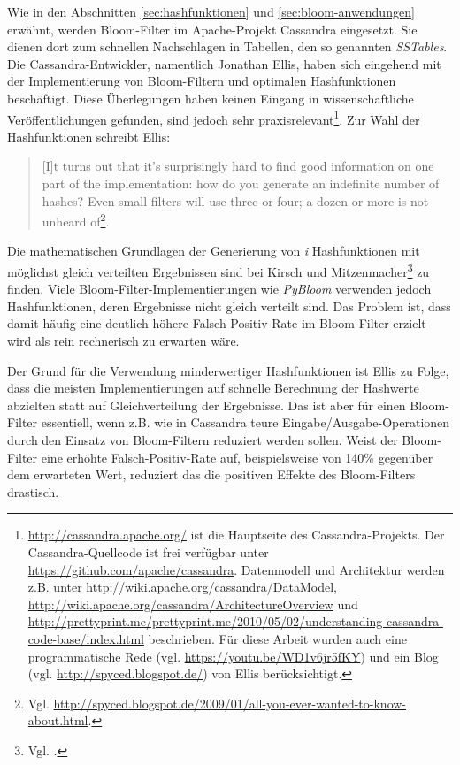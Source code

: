 Wie in den Abschnitten \ref{sec:hashfunktionen} und \ref{sec:bloom-anwendungen} erwähnt, werden Bloom-Filter im Apache-Projekt Cassandra eingesetzt. Sie dienen dort zum schnellen Nachschlagen in Tabellen, den so genannten \textit{SSTables}. Die Cassandra-Entwickler, namentlich Jonathan Ellis, haben sich eingehend mit der Implementierung von Bloom-Filtern und optimalen Hashfunktionen beschäftigt. Diese Überlegungen haben keinen Eingang in wissenschaftliche Veröffentlichungen gefunden, sind jedoch sehr praxisrelevant\footnote{\url{http://cassandra.apache.org/} ist die Hauptseite des Cassandra-Projekts. Der Cassandra-Quellcode ist frei verfügbar unter \url{https://github.com/apache/cassandra}. Datenmodell und Architektur werden z.B. unter \url{http://wiki.apache.org/cassandra/DataModel}, \url{http://wiki.apache.org/cassandra/ArchitectureOverview} und \url{http://prettyprint.me/prettyprint.me/2010/05/02/understanding-cassandra-code-base/index.html} beschrieben. Für diese Arbeit wurden auch eine programmatische Rede (vgl. \url{https://youtu.be/WD1v6jr5fKY}) und ein Blog (vgl. \url{http://spyced.blogspot.de/}) von Ellis berücksichtigt.}. Zur Wahl der Hashfunktionen schreibt Ellis: 
\newpage
\begin{quote}
[I]t turns out that it's surprisingly hard to find good information on one part of the implementation: how do you generate an indefinite number of hashes? Even small filters will use three or four; a dozen or more is not unheard of\footnote{Vgl. \url{http://spyced.blogspot.de/2009/01/all-you-ever-wanted-to-know-about.html}.}. 
\end{quote}
Die mathematischen Grundlagen der Generierung von \textit{i} Hashfunktionen mit möglichst gleich verteilten Ergebnissen sind bei Kirsch und Mitzenmacher\footnote{Vgl. \cite{Kirsch2006}.} zu finden. Viele Bloom-Filter-Implementierungen wie \textit{PyBloom} verwenden jedoch Hashfunktionen, deren Ergebnisse nicht gleich verteilt sind. Das Problem ist, dass damit häufig eine deutlich höhere Falsch-Positiv-Rate im Bloom-Filter erzielt wird als rein rechnerisch zu erwarten wäre. 

Der Grund für die Verwendung minderwertiger Hashfunktionen ist Ellis zu Folge, dass die meisten Implementierungen auf schnelle Berechnung der Hashwerte abzielten statt auf Gleichverteilung der Ergebnisse. Das ist aber für einen Bloom-Filter essentiell, wenn z.B. wie in Cassandra teure Eingabe/Ausgabe-Operationen durch den Einsatz von Bloom-Filtern reduziert werden sollen. Weist der Bloom-Filter eine erhöhte Falsch-Positiv-Rate auf, beispielsweise von 140\% gegenüber dem erwarteten Wert, reduziert das die positiven Effekte des Bloom-Filters drastisch.  

